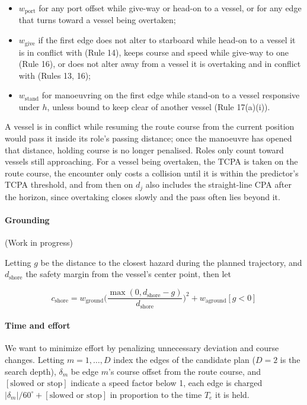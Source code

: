 \documentclass[10pt,a4paper]{article}
\begin{document}
\begin{itemize}
  \item $w_{\text{port}}$ for any port offset while give-way or head-on to a vessel, or for any edge that turns toward a vessel being overtaken;
  \item $w_{\text{give}}$ if the first edge does not alter to starboard while head-on to a vessel it is in conflict with (Rule 14), keeps course and speed while give-way to one (Rule 16), or does not alter away from a vessel it is overtaking and in conflict with (Rules 13, 16);
  \item $w_{\text{stand}}$ for manoeuvring on the first edge while stand-on to a vessel responsive under $h$, unless bound to keep clear of another vessel (Rule 17(a)(i)).
\end{itemize}
A vessel is in conflict while resuming the route course from the current position would pass it inside its role's passing distance; once the manoeuvre has opened that distance, holding course is no longer penalised. Roles only count toward vessels still approaching. For a vessel being overtaken, the TCPA is taken on the route course, the encounter only costs a collision until it is within the predictor's TCPA threshold, and from then on $d_j$ also includes the straight-line CPA after the horizon, since overtaking closes slowly and the pass often lies beyond it.

\paragraph{Grounding} (Work in progress)

Letting $g$ be the distance to the closest hazard during the planned trajectory, and $d_{\text{shore}}$ the safety margin from the vessel's center point, then let

\begin{equation}
  c_{\text{shore}} = w_{\text{ground}}\Big(\frac{\max(0, d_{\text{shore}} - g)}{d_{\text{shore}}}\Big)^2 + w_{\text{aground}}[g<0]
\end{equation}

\paragraph{Time and effort}

We want to minimize effort by penalizing unnecessary deviation and course changes. Letting $m = 1, \dots, D$
index the edges of the candidate plan ($D = 2$ is the search depth), $\delta_m$ be edge $m$'s course offset
from the route course, and $[\text{slowed or stop}]$ indicate a speed factor below 1, each edge is charged
$|\delta_m|/60^\circ + [\text{slowed or stop}]$ in proportion to the time $T_e$ it is held.
\end{document}

